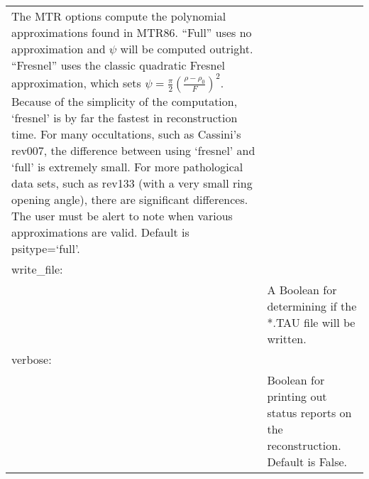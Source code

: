 \begin{table}[H]
\begin{tabular}{lp{5in}}
                     The MTR options compute the polynomial
                     approximations found in MTR86.
                     ``Full'' uses no approximation and $\psi$ will be
                     computed outright. ``Fresnel'' uses the
                     classic quadratic Fresnel approximation,
                     which sets
                     $\psi=\frac{\pi}{2}(\frac{\rho-\rho_{0}}{F})^{2}$.
                     Because of the simplicity of the computation,
                     `fresnel' is by far the fastest in
                     reconstruction time. For many
                     occultations, such as Cassini's rev007,
                     the difference between using `fresnel' and `full'
                     is extremely small.
                     For more pathological
                     data sets, such as rev133 (with a very small ring opening angle), there are significant
                     differences. The user must be alert to note when
                     various approximations are valid.
                     Default is psitype=`full'.\\
                    write\_file:&\\
                    &A Boolean for determining if the *.TAU file will
                     be written.\\
                    verbose:&\\
                    &Boolean for printing out status reports on
                     the reconstruction. Default is False.
                \end{tabular}
            \end{table}